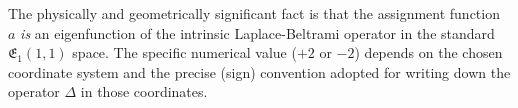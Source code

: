 \documentclass[12pt]{article}
\begin{document}
The physically and geometrically significant fact is that the assignment function \( a \) \emph{is} an eigenfunction of the intrinsic Laplace-Beltrami operator in the standard \( \mathfrak{E}_1(1, 1) \) space. The specific numerical value (\(+2\) or \(-2\)) depends on the chosen coordinate system and the precise (sign) convention adopted for writing down the operator \( \Delta \) in those coordinates.


\end{document}

